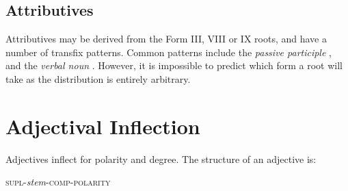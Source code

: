 \documentclass[grammar]{subfiles}
\begin{document}
%

  \subsection{Attributives}
  \label{ssec:am_attributives}

  Attributives may be derived from the Form III, VIII or IX roots, and have a number of transfix patterns. Common patterns include the \emph{passive participle} , and the \emph{verbal noun} . 
  However, it is impossible to predict which form a root will take as the distribution is entirely arbitrary.

%
%

  \section{Adjectival Inflection}
  \label{sec:am_adjectival_inflection}

  Adjectives inflect for polarity and degree. The structure of an adjective is:

  \begin{exe}
    \ex\label{ex:am_adjective_structure} \textsc{supl-}\textit{stem}\textsc{-comp-polarity}
  \end{exe}	
\end{document}
